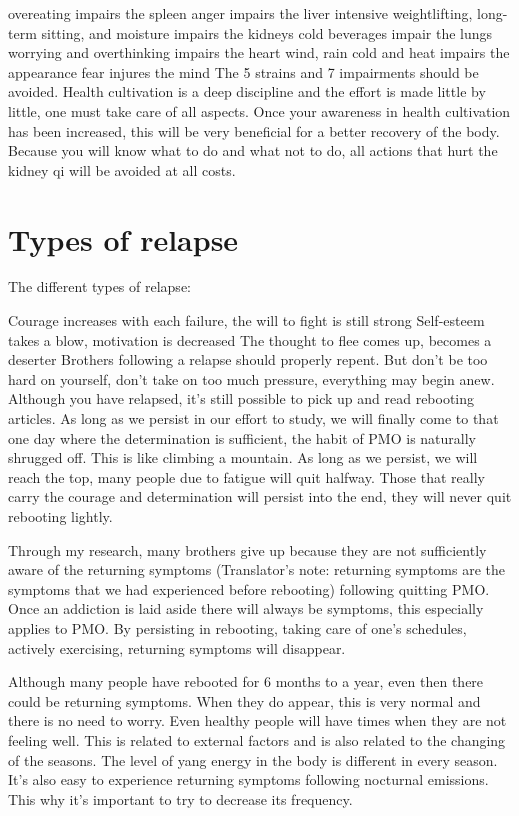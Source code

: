 \documentclass[
]{book}
\begin{document}
overeating impairs the spleen
anger impairs the liver
intensive weightlifting, long-term sitting, and moisture impairs the kidneys
cold beverages impair the lungs
worrying and overthinking impairs the heart
wind, rain cold and heat impairs the appearance
fear injures the mind
The 5 strains and 7 impairments should be avoided. Health cultivation is a deep discipline and the effort is made little by little, one must take care of all aspects. Once your awareness in health cultivation has been increased, this will be very beneficial for a better recovery of the body. Because you will know what to do and what not to do, all actions that hurt the kidney qi will be avoided at all costs.

\hypertarget{types-of-relapse}{%
\section{Types of relapse}\label{types-of-relapse}}

The different types of relapse:

Courage increases with each failure, the will to fight is still strong
Self-esteem takes a blow, motivation is decreased
The thought to flee comes up, becomes a deserter
Brothers following a relapse should properly repent. But don't be too hard on yourself, don't take on too much pressure, everything may begin anew. Although you have relapsed, it's still possible to pick up and read rebooting articles. As long as we persist in our effort to study, we will finally come to that one day where the determination is sufficient, the habit of PMO is naturally shrugged off. This is like climbing a mountain. As long as we persist, we will reach the top, many people due to fatigue will quit halfway. Those that really carry the courage and determination will persist into the end, they will never quit rebooting lightly.

Through my research, many brothers give up because they are not sufficiently aware of the returning symptoms (Translator's note: returning symptoms are the symptoms that we had experienced before rebooting) following quitting PMO. Once an addiction is laid aside there will always be symptoms, this especially applies to PMO. By persisting in rebooting, taking care of one's schedules, actively exercising, returning symptoms will disappear.

Although many people have rebooted for 6 months to a year, even then there could be returning symptoms. When they do appear, this is very normal and there is no need to worry. Even healthy people will have times when they are not feeling well. This is related to external factors and is also related to the changing of the seasons. The level of yang energy in the body is different in every season. It's also easy to experience returning symptoms following nocturnal emissions. This why it's important to try to decrease its frequency.
\end{document}
